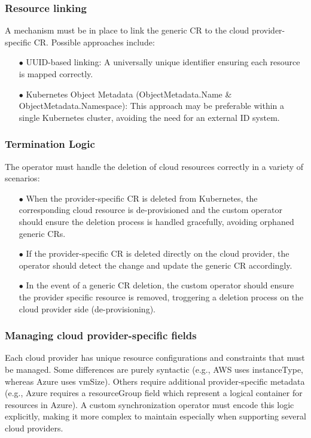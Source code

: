 \subsubsection{Resource linking}

A mechanism must be in place to link the generic CR to the cloud provider-specific CR. Possible approaches include:
\begin{itemize}[itemsep=0.2pt, topsep=1pt]
  \item[$\bullet$] UUID-based linking: A universally unique identifier ensuring each resource is mapped correctly.
  \item[$\bullet$] Kubernetes Object Metadata (ObjectMetadata.Name \& ObjectMetadata.Namespace): This approach may be preferable within a single Kubernetes cluster, avoiding the need for an external ID system.
\end{itemize}

\subsubsection{Termination Logic}

The operator must handle the deletion of cloud resources correctly in a variety of scenarios:
\begin{itemize}[itemsep=0.2pt, topsep=1pt]
  \item[$\bullet$] When the provider-specific CR is deleted from Kubernetes, the corresponding cloud resource is de-provisioned and the custom operator should ensure the deletion process is handled gracefully, avoiding orphaned generic CRs.
  \item[$\bullet$] If the provider-specific CR is deleted directly on the cloud provider, the operator should detect the change and update the generic CR accordingly.
  \item[$\bullet$] In the event of a generic CR deletion, the custom operator should ensure the provider specific resource is removed, troggering a deletion process on the cloud provider side (de-provisioning).
\end{itemize}

\subsubsection{Managing cloud provider-specific fields}
Each cloud provider has unique resource configurations and constraints that must be managed.
Some differences are purely syntactic (e.g., AWS uses instanceType, whereas Azure uses vmSize).
Others require additional provider-specific metadata (e.g., Azure requires a resourceGroup field which represent a logical container for resources in Azure).
A custom synchronization operator must encode this logic explicitly, making it more complex to maintain especially when supporting several cloud providers.

